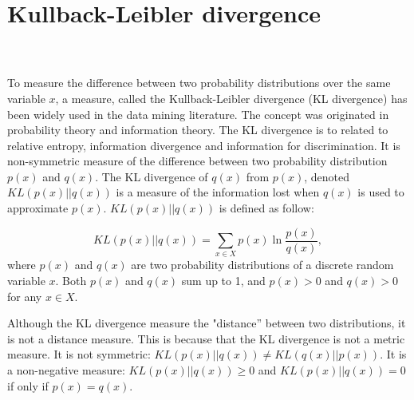 \begin{appendices}
\label{appendix:kl}
\chapter{Kullback-Leibler divergence}
\\\\To measure the difference between two probability distributions over the same variable $x$, a measure, called the Kullback-Leibler divergence (KL divergence) has been widely used in the data mining literature. The concept was originated in probability theory and information theory. The KL divergence is to related to relative entropy, information divergence and information for discrimination. It is non-symmetric measure of the difference between two probability distribution $p(x)$ and $q(x)$. The KL divergence of $q(x)$ from $p(x)$, denoted $KL(p(x)||q(x))$ is a measure of the information lost when $q(x)$ is used to approximate $p(x)$.
$KL(p(x)||q(x))$ is defined as follow:

\begin{equation}
    KL(p(x)||q(x)) = \sum_{x\in X}p(x)\ln\frac{p(x)}{q(x)},
\end{equation}
where $p(x)$ and $q(x)$ are two probability distributions of a discrete random variable $x$. Both $p(x)$ and $q(x)$ sum up to 1, and $p(x) > 0$ and $q(x) > 0$ for any $x \in X$.

Although the KL divergence measure the "distance'' between two distributions, it is not a distance measure. This is because that the KL divergence is not a metric measure. It is not symmetric: $KL(p(x)||q(x))\neq KL(q(x)||p(x))$. It is a non-negative measure: $KL(p(x)||q(x)) \geq 0$ and $KL(p(x)||q(x))=0$ if only if $p(x) = q(x)$.
\end{appendices}
